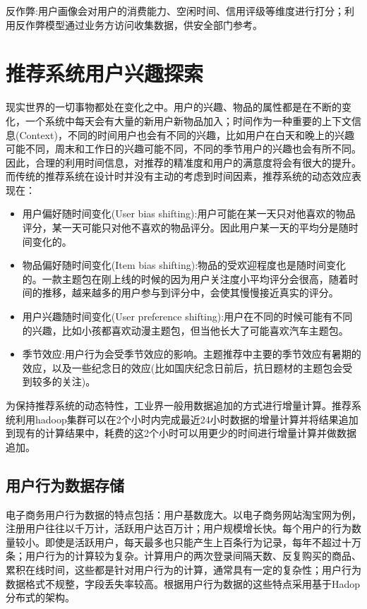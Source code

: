 		反作弊:用户画像会对用户的消费能力、空闲时间、信用评级等维度进行打分；利用反作弊模型通过业务方访问收集数据，供安全部门参考。

	\section{推荐系统用户兴趣探索}
		现实世界的一切事物都处在变化之中。用户的兴趣、物品的属性都是在不断的变化，一个系统中每天会有大量的新用户新物品加入；时间作为一种重要的上下文信息(Context)，不同的时间用户也会有不同的兴趣，比如用户在白天和晚上的兴趣可能不同，周末和工作日的兴趣可能不同，不同的季节用户的兴趣也会有所不同。因此，合理的利用时间信息，对推荐的精准度和用户的满意度将会有很大的提升。而传统的推荐系统在设计时并没有主动的考虑到时间因素，推荐系统的动态效应表现在：
		\begin{itemize}
		\item 用户偏好随时间变化(User bias shifting):用户可能在某一天只对他喜欢的物品评分，某一天可能只对他不喜欢的物品评分。因此用户某一天的平均分是随时间变化的。
		\item 物品偏好随时间变化(Item bias shifting):物品的受欢迎程度也是随时间变化的。一款主题包在刚上线的时候的因为用户关注度小平均评分会很高，随着时间的推移，越来越多的用户参与到评分中，会使其慢慢接近真实的评分。
		\item 用户兴趣随时间变化(User preference shifting):用户在不同的时候可能有不同的兴趣，比如小孩都喜欢动漫主题包，但当他长大了可能喜欢汽车主题包。
		\item 季节效应:用户行为会受季节效应的影响。主题推荐中主要的季节效应有暑期的效应，以及一些纪念日的效应(比如国庆纪念日前后，抗日题材的主题包会受到较多的关注)。
		\end{itemize}

		为保持推荐系统的动态特性，工业界一般用数据追加的方式进行增量计算。推荐系统利用hadoop集群可以在2个小时内完成最近24小时数据的增量计算并将结果追加到现有的计算结果中，耗费的这2个小时可以用更少的时间进行增量计算并做数据追加。

		\subsection{用户行为数据存储}
		电子商务用户行为数据的特点包括：用户基数庞大。以电子商务网站淘宝网为例，注册用户往往以千万计，活跃用户达百万计；用户规模增长快。每个用户的行为数量较小。即使是活跃用户，每天最多也只能产生上百条行为记录，每年不超过十万条；用户行为的计算较为复杂。计算用户的两次登录间隔天数、反复购买的商品、累积在线时间，这些都是针对用户行为的计算，通常具有一定的复杂性；用户行为数据格式不规整，字段丢失率较高。根据用户行为数据的这些特点采用基于Hadop分布式的架构。


